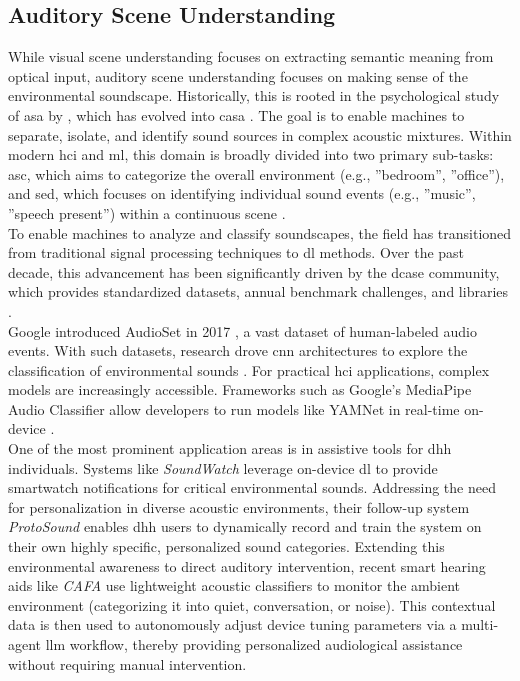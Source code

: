 \subsection{Auditory Scene Understanding}
\label{sec:auditory_scene_understanding}
While visual scene understanding focuses on extracting semantic meaning from optical input, auditory scene understanding focuses on making sense of the environmental soundscape. Historically, this is rooted in the psychological study of \gls{asa} by \citet{Bregman_90_AuditorySceneAnalysis}, which has evolved into \gls{casa} \cite{Wang_06_CASABook}. The goal is to enable machines to separate, isolate, and identify sound sources in complex acoustic mixtures. Within modern \gls{hci} and \gls{ml}, this domain is broadly divided into two primary sub-tasks: \gls{asc}, which aims to categorize the overall environment (e.g., ''bedroom'', ''office''), and \gls{sed}, which focuses on identifying individual sound events (e.g., ''music'', ''speech present'') within a continuous scene \cite{Mesaros_18_DCASEChallengeReview}.\\
To enable machines to analyze and classify soundscapes, the field has transitioned from traditional signal processing techniques to \gls{dl} methods. Over the past decade, this advancement has been significantly driven by the \gls{dcase} community, which provides standardized datasets, annual benchmark challenges, and libraries \cite{Zinemanas_20_IntroduceDCASE}. \\
Google introduced AudioSet in 2017 \cite{Gemmeke_17_AudioSet}, a vast dataset of human-labeled audio events. 
With such datasets, research drove \gls{cnn} architectures to explore the classification of environmental sounds \cite{Hershey_17_CNNforAudioClassif, Pham_23_ASCLightweight}.
For practical \gls{hci} applications, complex models are increasingly accessible. Frameworks such as Google's MediaPipe Audio Classifier allow developers to run models like YAMNet in real-time on-device \cite{URL_GoogleYamNet}.\\
One of the most prominent application areas is in assistive tools for \gls{dhh} individuals. Systems like \textit{SoundWatch} \cite{Jain_20_SoundWatch} leverage on-device \gls{dl} to provide smartwatch notifications for critical environmental sounds. Addressing the need for personalization in diverse acoustic environments, their follow-up system \textit{ProtoSound} \cite{Jain_22_ProtoSound} enables \gls{dhh} users to dynamically record and train the system on their own highly specific, personalized sound categories. Extending this environmental awareness to direct auditory intervention, recent smart hearing aids like \textit{CAFA} \cite{Ding_25_AmbientSoundHearingAidsAdaptive} use lightweight acoustic classifiers to monitor the ambient environment (categorizing it into quiet, conversation, or noise). This contextual data is then used to autonomously adjust device tuning parameters via a multi-agent \gls{llm} workflow, thereby providing personalized audiological assistance without requiring manual intervention.

